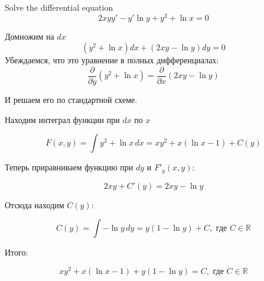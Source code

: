 \documentclass[addpoints, answers]{exam} %
\newcommand{\RR}{\mathbb{R}}
\begin{document}
\begin{questions}
\begin{parts}
\end{parts}

\question[10] Solve the differential equation
\[
2xyy' - y' \ln y + y^2 + \ln x =0
\]
\begin{solution}
Домножим на $dx$
\[
(y^2+\ln x)dx + (2xy - \ln y)dy=0
\]
Убеждаемся, что это уравнение в полных дифференциалах:
\[
\frac{\partial}{\partial y}(y^2+\ln x)=\frac{\partial}{\partial x}(2xy - \ln y)
\]

И решаем его по стандартной схеме.

Находим интеграл функции при $dx$ по $x$

\[
F(x,y)=\int  y^2+\ln x \, dx = xy^2 + x(\ln x - 1) + C(y)
\]

Теперь приравниваем функцию при $dy$  и $F'_y(x,y)$:

\[
2xy + C'(y)=2xy - \ln y
\]

Отсюда находим $C(y)$:

\[
C(y)=\int -\ln y \, dy = y(1-\ln y) + C, \text{ где } C\in \RR
\]

Итого:

\[
xy^2+x(\ln x - 1) + y(1-\ln y)=C, \text{ где } C\in \RR
\]


\end{solution}


\end{questions}
\end{document}
